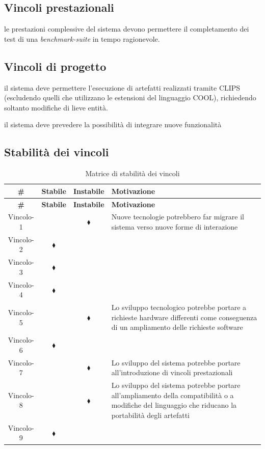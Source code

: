 \subsection{Vincoli prestazionali}
\vincolistart
	\item le prestazioni complessive del sistema devono permettere il completamento dei test di una \emph{benchmark-suite} in tempo ragionevole.
\vincoliend
\subsection{Vincoli di progetto}
\vincolistart
	\item il sistema deve permettere l'esecuzione di artefatti realizzati tramite CLIPS (escludendo quelli che utilizzano le estensioni del linguaggio COOL), richiedendo soltanto modifiche di lieve entità.
	
	\item il sistema deve prevedere la possibilità di integrare nuove funzionalità
\vincoliend

\subsection{Stabilità dei vincoli}

\begin{longtable}{|c|c|c|p{7cm}|}
\caption{Matrice di stabilità dei vincoli}\label{tab:stabilita-vincoli}\\
\hline\hline
\rowcolor{grigio-chiarissimo} \textbf{\#} & \textbf{Stabile} & \textbf{Instabile} & \textbf{Motivazione} \\
\hline\hline
\endfirsthead
\hline\hline
\rowcolor{grigio-chiarissimo} \textbf{\#} & \textbf{Stabile} & \textbf{Instabile} & \textbf{Motivazione} \\
\hline\hline
\endhead

Vincolo-1 &  & $\blacklozenge$ & Nuove tecnologie potrebbero far migrare il sistema verso nuove forme di interazione \\ 
\hline 
Vincolo-2 & $\blacklozenge$ &  &  \\ 
\hline 
Vincolo-3 & $\blacklozenge$ & & \\ 
\hline 
Vincolo-4 & $\blacklozenge$ & & \\ 
\hline 
Vincolo-5 &  & $\blacklozenge$ & Lo sviluppo tecnologico potrebbe portare a richieste hardware differenti come conseguenza di un ampliamento delle richieste software \\ 
\hline 
Vincolo-6 & $\blacklozenge$ & & \\ 
\hline 
Vincolo-7 & & $\blacklozenge$ & Lo sviluppo del sistema potrebbe portare all'introduzione di vincoli prestazionali \\ 
\hline 
Vincolo-8 & & $\blacklozenge$ & Lo sviluppo del sistema potrebbe portare all'ampliamento della compatibilità o a modifiche del linguaggio che riducano la portabilità degli artefatti\\ 
\hline 
Vincolo-9 & $\blacklozenge$ & & \\ 
\hline

\end{longtable}


